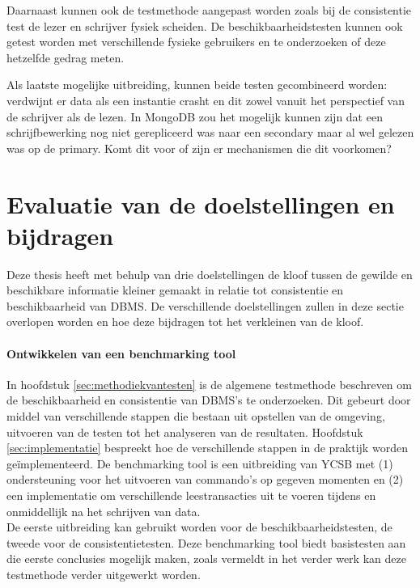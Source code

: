 Daarnaast kunnen ook de testmethode aangepast worden zoals bij de consistentie test de lezer en schrijver fysiek scheiden. De beschikbaarheidstesten kunnen ook getest worden met verschillende fysieke gebruikers en te onderzoeken of deze hetzelfde gedrag meten. 

Als laatste mogelijke uitbreiding, kunnen beide testen gecombineerd worden: verdwijnt er data als een instantie crasht en dit zowel vanuit het perspectief van de schrijver als de lezen. In MongoDB zou het mogelijk kunnen zijn dat een schrijfbewerking nog niet gerepliceerd was naar een secondary maar al wel gelezen was op de primary. Komt dit voor of zijn er mechanismen die dit voorkomen?  

\section{Evaluatie van de doelstellingen en bijdragen}
Deze thesis heeft met behulp van drie doelstellingen de kloof tussen de gewilde en beschikbare informatie kleiner gemaakt in relatie tot consistentie en beschikbaarheid van DBMS. De verschillende doelstellingen zullen in deze sectie overlopen worden en hoe deze bijdragen tot het verkleinen van de kloof. 

\paragraph{Ontwikkelen van een benchmarking tool} In hoofdstuk \ref{sec:methodiekvantesten} is de algemene testmethode beschreven om de beschikbaarheid en consistentie van DBMS's te onderzoeken. Dit gebeurt door middel van verschillende stappen die bestaan uit opstellen van de omgeving, uitvoeren van de testen tot het analyseren van de resultaten. Hoofdstuk \ref{sec:implementatie} bespreekt hoe de verschillende stappen in de praktijk worden geïmplementeerd. De benchmarking tool is een uitbreiding van YCSB\cite{cooper2010benchmarking} met (1) ondersteuning voor het uitvoeren van commando's op gegeven momenten en (2) een implementatie om verschillende leestransacties uit te voeren tijdens en onmiddellijk na het schrijven van data. \\
De eerste uitbreiding kan gebruikt worden voor de beschikbaarheidstesten, de tweede voor de consistentietesten. Deze benchmarking tool biedt basistesten aan die eerste conclusies mogelijk maken, zoals vermeldt in het verder werk kan deze testmethode verder uitgewerkt worden. 

